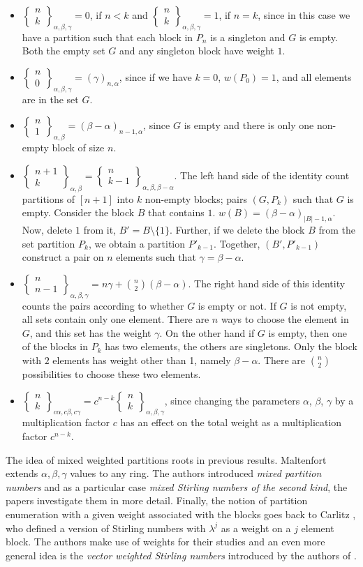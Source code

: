 \documentclass[12pt, reqno]{amsart}
\newtheorem{proof 1}{proof 1}
\def\sts#1#2{\begin{Bmatrix}
#1 \\ #2 \end{Bmatrix}}
\begin{document}
\begin{itemize}
\item $\sts{n}{k}_{\alpha,\beta,\gamma}=0$, if $n<k$ and $\sts{n}{k}_{\alpha,\beta,\gamma}=1$, if $n=k$, since in this case we have a partition such that each block in $P_n$ is a singleton and $G$ is empty. Both the empty set $G$ and any singleton block have weight $1$. 
\item $\sts{n}{0}_{\alpha,\beta,\gamma} =(\gamma)_{n,\alpha}$, since if we have $k=0$, $w(P_0)=1$, and all elements are in the set $G$.
\item $\sts{n}{1}_{\alpha,\beta} = (\beta-\alpha)_{n-1,\alpha}$, since $G$ is empty and there is only one non-empty block of size $n$. 
\item $\sts{n+1}{k}_{\alpha,\beta}=\sts{n}{k-1}_{\alpha,\beta,\beta-\alpha}$. 
The left hand side of the identity count partitions of $[n+1]$ into $k$ non-empty blocks; pairs $(G, P_k)$ such that $G$ is empty. Consider the block $B$ that contains $1$. $w(B)= (\beta-\alpha)_{|B|-1,\alpha}$. Now, delete $1$ from it, $B' = B\setminus \{1\}$. Further, if we delete the block $B$ from the set partition $P_k$, we obtain a partition $P'_{k-1}$.  Together, $(B', P'_{k-1})$ construct a pair on $n$ elements such that $\gamma = \beta-\alpha$. 
\item $\sts{n}{n-1}_{\alpha,\beta,\gamma}= n\gamma+\binom{n}{2}(\beta-\alpha)$. The right hand side of this identity 
counts the pairs according to whether $G$ is empty or not. If $G$ is not empty, all sets contain only one element. There are $n$ ways to choose the element in $G$, and this set has the weight $\gamma$. On the other hand if $G$ is empty, then one of the blocks in $P_k$ has two elements, the others are singletons. Only the block with $2$ elements has weight other than 1, namely $\beta-\alpha$. There are $\binom{n}{2}$ possibilities to choose these two elements.  
\item $\sts{n}{k}_{c\alpha,c\beta,c\gamma} = c^{n-k}\sts{n}{k}_{\alpha,\beta,\gamma}$, since changing the parameters $\alpha$, $\beta$, $\gamma$ by a multiplication factor $c$ has an effect on the total weight as a multiplication factor $c^{n-k}$.  
\end{itemize}

The idea of mixed weighted partitions roots in previous results. Maltenfort \cite{Maltenfort2020} extends $\alpha, \beta,\gamma$ values to any ring. The authors \cite{Yaqubi2016} introduced \emph{mixed partition numbers} and as a particular case \emph{mixed Stirling numbers of the second kind}, the papers \cite{Barati19, BenyiYaqubi2019} investigate them in more detail. Finally, the notion of partition enumeration  with a given weight associated with the blocks goes back to Carlitz \cite{Carlitz_weighted}, who defined a version of Stirling numbers with $\lambda^j$ as a weight on a $j$ element block. The authors \cite{Belbachir2014, Belbachir2021} make use of weights for their studies and an even more general idea is the \emph{vector weighted Stirling numbers} introduced by the authors of \cite{Esmaeeli2021}. 
\end{document}
